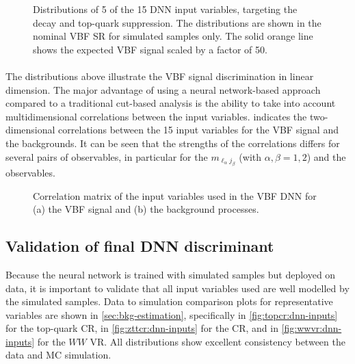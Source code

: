 \begin{figure}[ht]
{    }
    {\caption[Distributions of 5 of the 15 DNN input variables, targeting the \HWW decay and top-quark suppression.]{
            Distributions of 5 of the 15 DNN input variables, targeting the \HWW decay and top-quark suppression. The distributions are shown in the nominal VBF SR for simulated samples only. The solid orange line shows the expected VBF signal scaled by a factor of 50. 
            \label{fig:dnn-inputs-post-fit2} }}
\end{figure}

\paragraph{}
\noindent The distributions above illustrate the VBF signal discrimination in linear dimension. The major advantage of using a neural network-based approach compared to a traditional cut-based analysis is the ability to take into account multidimensional correlations between the input variables.  indicates the two-dimensional correlations between the 15 input variables for the VBF signal and the backgrounds. It can be seen that the strengths of the correlations differs for several pairs of observables, in particular for the $m_{\ell_\alpha j_\beta}$ (with $\alpha, \beta = 1, 2$) and the \pTjthree observables.
\begin{figure}[ht]
    \caption[Correlation matrix of the input variables used in the VBF DNN.]{Correlation matrix of the input variables used in the VBF DNN for (a) the VBF signal and (b) the background processes.}
    \label{fig:dnn-features-correlations}
\end{figure}

\subsection{Validation of final DNN discriminant}
\label{subsec:fina-model-validation}
Because the neural network is trained with simulated samples but deployed on data, it is important to validate that all input variables used are well modelled by the simulated samples.
Data to simulation comparison plots for representative variables are shown in \cref{sec:bkg-estimation}, specifically in \cref{fig:topcr:dnn-inputs} for the top-quark CR, in \cref{fig:zttcr:dnn-inputs} for the \Ztautau CR, and in \cref{fig:wwvr:dnn-inputs} for the $WW$ VR. All distributions show excellent consistency between the data and MC simulation.

